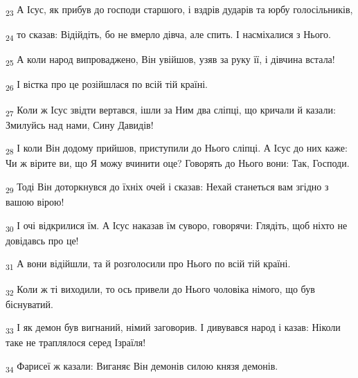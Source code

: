 \begin{tcolorbox}
\textsubscript{23} А Ісус, як прибув до господи старшого, і вздрів дударів та юрбу голосільників,
\end{tcolorbox}
\begin{tcolorbox}
\textsubscript{24} то сказав: Відійдіть, бо не вмерло дівча, але спить. І насміхалися з Нього.
\end{tcolorbox}
\begin{tcolorbox}
\textsubscript{25} А коли народ випроваджено, Він увійшов, узяв за руку її, і дівчина встала!
\end{tcolorbox}
\begin{tcolorbox}
\textsubscript{26} І вістка про це розійшлася по всій тій країні.
\end{tcolorbox}
\begin{tcolorbox}
\textsubscript{27} Коли ж Ісус звідти вертався, ішли за Ним два сліпці, що кричали й казали: Змилуйсь над нами, Сину Давидів!
\end{tcolorbox}
\begin{tcolorbox}
\textsubscript{28} І коли Він додому прийшов, приступили до Нього сліпці. А Ісус до них каже: Чи ж вірите ви, що Я можу вчинити оце? Говорять до Нього вони: Так, Господи.
\end{tcolorbox}
\begin{tcolorbox}
\textsubscript{29} Тоді Він доторкнувся до їхніх очей і сказав: Нехай станеться вам згідно з вашою вірою!
\end{tcolorbox}
\begin{tcolorbox}
\textsubscript{30} І очі відкрилися їм. А Ісус наказав їм суворо, говорячи: Глядіть, щоб ніхто не довідавсь про це!
\end{tcolorbox}
\begin{tcolorbox}
\textsubscript{31} А вони відійшли, та й розголосили про Нього по всій тій країні.
\end{tcolorbox}
\begin{tcolorbox}
\textsubscript{32} Коли ж ті виходили, то ось привели до Нього чоловіка німого, що був біснуватий.
\end{tcolorbox}
\begin{tcolorbox}
\textsubscript{33} І як демон був вигнаний, німий заговорив. І дивувався народ і казав: Ніколи таке не траплялося серед Ізраїля!
\end{tcolorbox}
\begin{tcolorbox}
\textsubscript{34} Фарисеї ж казали: Виганяє Він демонів силою князя демонів.
\end{tcolorbox}
